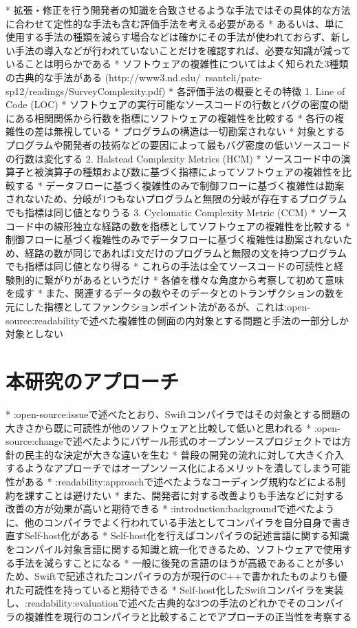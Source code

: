 * 拡張・修正を行う開発者の知識を合致させるような手法ではその具体的な方法に合わせて定性的な手法も含む評価手法を考える必要がある
* あるいは、単に使用する手法の種類を減らす場合などは確かにその手法が使われておらず、新しい手法の導入などが行われていないことだけを確認すれば、必要な知識が減っていることは明らかである
* ソフトウェアの複雑性についてはよく知られた3種類の古典的な手法がある (http://www3.nd.edu/~rsanteli/pate-sp12/readings/SurveyComplexity.pdf)
* 各評価手法の概要とその特徴
    1. Line of Code (LOC)
        * ソフトウェアの実行可能なソースコードの行数とバグの密度の間にある相関関係から行数を指標にソフトウェアの複雑性を比較する
        * 各行の複雑性の差は無視している
        * プログラムの構造は一切勘案されない
        * 対象とするプログラムや開発者の技術などの要因によって最もバグ密度の低いソースコードの行数は変化する
    2. Halstead Complexity Metrics (HCM)
        * ソースコード中の演算子と被演算子の種類および数に基づく指標によってソフトウェアの複雑性を比較する
        * データフローに基づく複雑性のみで制御フローに基づく複雑性は勘案されないため、分岐が1つもないプログラムと無限の分岐が存在するプログラムでも指標は同じ値となりうる
    3. Cyclomatic Complexity Metric (CCM)
        * ソースコード中の線形独立な経路の数を指標としてソフトウェアの複雑性を比較する
        * 制御フローに基づく複雑性のみでデータフローに基づく複雑性は勘案されないため、経路の数が同じであれば1文だけのプログラムと無限の文を持つプログラムでも指標は同じ値となり得る
* これらの手法は全てソースコードの可読性と経験則的に繋がりがあるというだけ
* 各値を様々な角度から考察して初めて意味を成す
* また、関連するデータの数やそのデータとのトランザクションの数を元にした指標としてファンクションポイント法があるが、これは:open-source:readabilityで述べた複雑性の側面の内対象とする問題と手法の一部分しか対象としない

\section{本研究のアプローチ}
\label{readability:idea}

* :open-source:issueで述べたとおり、Swiftコンパイラではその対象とする問題の大きさから既に可読性が他のソフトウェアと比較して低いと思われる
* :open-source:changeで述べたようにバザール形式のオープンソースプロジェクトでは方針の民主的な決定が大きな違いを生む
* 普段の開発の流れに対して大きく介入するようなアプローチではオープンソース化によるメリットを潰してしまう可能性がある
* :readability:approachで述べたようなコーディング規約などによる制約を課すことは避けたい
* また、開発者に対する改善よりも手法などに対する改善の方が効果が高いと期待できる
* :introduction:backgroundで述べたように、他のコンパイラでよく行われている手法としてコンパイラを自分自身で書き直すSelf-host化がある
* Self-host化を行えばコンパイラの記述言語に関する知識をコンパイル対象言語に関する知識と統一化できるため、ソフトウェアで使用する手法を減らすことになる
* 一般に後発の言語のほうが高級であることが多いため、Swiftで記述されたコンパイラの方が現行のC++で書かれたものよりも優れた可読性を持っていると期待できる
* Self-host化したSwiftコンパイラを実装し、:readability:evaluationで述べた古典的な3つの手法のどれかでそのコンパイラの複雑性を現行のコンパイラと比較することでアプローチの正当性を考察する

